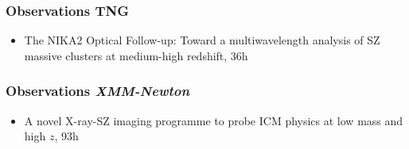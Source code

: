 \subsubsection{Observations TNG}
\begin{itemize}[leftmargin=20pt]
    \item The NIKA2 Optical Follow-up: Toward a multiwavelength analysis of SZ massive clusters at medium-high redshift, 36h
\end{itemize}
\vspace{-3pt}

\subsubsection{Observations \textit{XMM-Newton}}
\begin{itemize}[leftmargin=20pt]
    \item A novel X-ray-SZ imaging programme to probe ICM physics at low mass and high $z$, 93h
\end{itemize}
